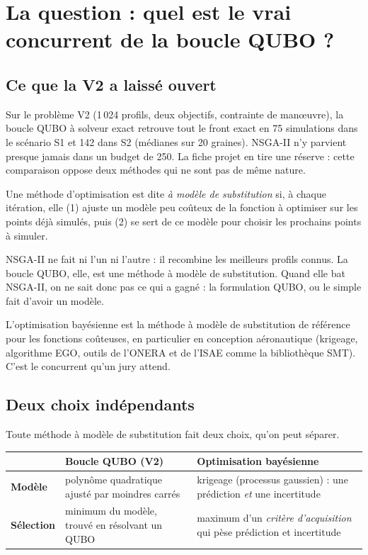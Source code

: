 \chapter{La question : quel est le vrai concurrent de la boucle QUBO ?}\label{ch:question}

\section{Ce que la V2 a laissé ouvert}
Sur le problème V2 (1\,024 profils, deux objectifs, contrainte de manœuvre), la boucle QUBO à solveur exact retrouve tout le front exact en 75 simulations dans le scénario S1 et 142 dans S2 (médianes sur 20 graines). NSGA-II n'y parvient presque jamais dans un budget de 250. La fiche projet en tire une réserve : cette comparaison oppose deux méthodes qui ne sont pas de même nature.

\begin{definition}
Une méthode d'optimisation est dite \emph{à modèle de substitution} si, à chaque itération, elle (1) ajuste un modèle peu coûteux de la fonction à optimiser sur les points déjà simulés, puis (2) se sert de ce modèle pour choisir les prochains points à simuler.
\end{definition}

NSGA-II ne fait ni l'un ni l'autre : il recombine les meilleurs profils connus. La boucle QUBO, elle, est une méthode à modèle de substitution. Quand elle bat NSGA-II, on ne sait donc pas ce qui a gagné : la formulation QUBO, ou le simple fait d'avoir un modèle.

\begin{projet}
L'optimisation bayésienne est la méthode à modèle de substitution de référence pour les fonctions coûteuses, en particulier en conception aéronautique (krigeage, algorithme EGO, outils de l'ONERA et de l'ISAE comme la bibliothèque SMT). C'est le concurrent qu'un jury attend.
\end{projet}

\section{Deux choix indépendants}
Toute méthode à modèle de substitution fait deux choix, qu'on peut séparer.

\begin{center}
\renewcommand{\arraystretch}{1.25}
\begin{tabularx}{\linewidth}{lXX}
\toprule
 & Boucle QUBO (V2) & Optimisation bayésienne \\
\midrule
\textbf{Modèle} & polynôme quadratique ajusté par moindres carrés & krigeage (processus gaussien) : une prédiction \emph{et} une incertitude \\
\textbf{Sélection} & minimum du modèle, trouvé en résolvant un QUBO & maximum d'un \emph{critère d'acquisition} qui pèse prédiction et incertitude \\
\bottomrule
\end{tabularx}
\end{center}

